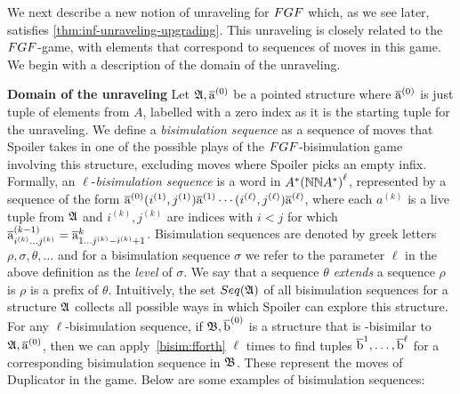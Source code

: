 We next describe a new notion of unraveling for $\FGF$ which, as we see later, satisfies \cref{thm:inf-unraveling-upgrading}.
This unraveling is closely related to the $\FGF$-game, with elements that correspond to sequences of moves in this game.
We begin with a description of the domain of the unraveling.

\noindent \textbf{Domain of the unraveling}
Let ${\mathfrak{A}}, \overline{\mathrm{a}}^{(0)}$ be a pointed structure where $\overline{\mathrm{a}}^{(0)}$ is just tuple of elements from $A$, labelled with a zero index as it is the starting tuple for the unraveling.
We define a \emph{bisimulation sequence} as a sequence of moves that Spoiler takes in one of the possible plays of the $\FGF$-bisimulation game involving this structure, excluding moves where Spoiler picks an empty infix.
Formally, an $\ell$-\emph{bisimulation sequence} is a word in $A^*{({\mathbb{N}}{\mathbb{N}}{}A^{*})}^{\ell}$, represented by a sequence of the form $\overline{\mathrm{a}}^{(0)}(i^{(1)}, j^{(1)})\overline{\mathrm{a}}^{(1)}\cdots(i^{(\ell)}, j^{(\ell)})\overline{\mathrm{a}}^{(\ell)}$, where each $a^{(k)}$ is a live tuple from ${\mathfrak{A}}$ and $i^{(k)}, j^{(k)}$ are indices with $i < j$ for which $\overline{\mathrm{a}}_{i^{(k)}\ldots j^{(k)}}^{(k-1)} = \overline{\mathrm{a}}_{1\ldots j^{(k)}-i^{(k)}+1}^{k}$.
Bisimulation sequences are denoted by greek letters $\rho, \sigma, \theta, \ldots$ and for
a bisimulation sequence $\sigma$ we refer to the parameter $\ell$ in the above definition as the \emph{level} of $\sigma$.
We say that a sequence $\theta$ \emph{extends} a sequence $\rho$ is $\rho$ is a prefix of $\theta$.
Intuitively, the set $\Seq{A}$ of all bisimulation sequences for a structure ${\mathfrak{A}}$ collects all possible ways in which Spoiler can explore this structure.
For any $\ell$-bisimulation sequence, if ${\mathfrak{B}}, \overline{\mathrm{b}}^{(0)}$ is a structure that is \FGF-bisimilar to ${\mathfrak{A}}, \overline{\mathrm{a}}^{(0)}$, then we can apply~\ref{bisim:fforth} $\ell$ times to find tuples $\overline{\mathrm{b}}^{1}, \ldots, \overline{\mathrm{b}}^{\ell}$ for a corresponding bisimulation sequence in ${\mathfrak{B}}$.
These represent the moves of Duplicator in the game.
Below are some examples of bisimulation sequences:
